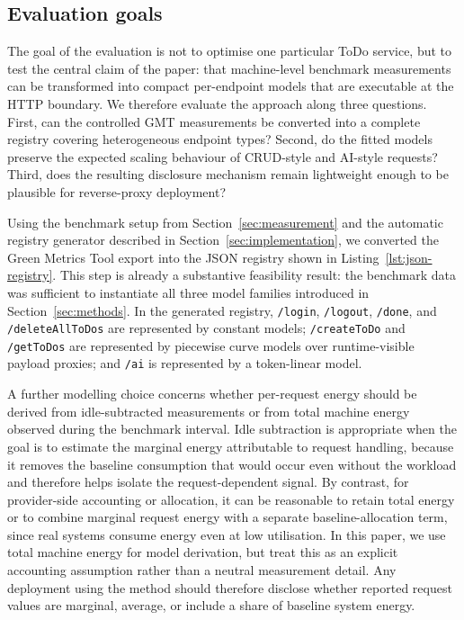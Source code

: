 \subsection{Evaluation goals}
The goal of the evaluation is not to optimise one particular ToDo service, but to test the central claim of the paper: that machine-level benchmark measurements can be transformed into compact per-endpoint models that are executable at the HTTP boundary. We therefore evaluate the approach along three questions. First, can the controlled GMT measurements be converted into a complete registry covering heterogeneous endpoint types? Second, do the fitted models preserve the expected scaling behaviour of CRUD-style and AI-style requests? Third, does the resulting disclosure mechanism remain lightweight enough to be plausible for reverse-proxy deployment?

Using the benchmark setup from Section~\ref{sec:measurement} and the automatic registry generator described in Section~\ref{sec:implementation}, we converted the Green Metrics Tool export into the JSON registry shown in Listing~\ref{lst:json-registry}. This step is already a substantive feasibility result: the benchmark data was sufficient to instantiate all three model families introduced in Section~\ref{sec:methods}. In the generated registry, \texttt{/login}, \texttt{/logout}, \texttt{/done}, and \texttt{/deleteAllToDos} are represented by constant models; \texttt{/createToDo} and \texttt{/getToDos} are represented by piecewise curve models over runtime-visible payload proxies; and \texttt{/ai} is represented by a token-linear model.

A further modelling choice concerns whether per-request energy should be derived from idle-subtracted measurements or from total machine energy observed during the benchmark interval. Idle subtraction is appropriate when the goal is to estimate the marginal energy attributable to request handling, because it removes the baseline consumption that would occur even without the workload and therefore helps isolate the request-dependent signal. By contrast, for provider-side accounting or allocation, it can be reasonable to retain total energy or to combine marginal request energy with a separate baseline-allocation term, since real systems consume energy even at low utilisation. In this paper, we use total machine energy for model derivation, but treat this as an explicit accounting assumption rather than a neutral measurement detail. Any deployment using the method should therefore disclose whether reported request values are marginal, average, or include a share of baseline system energy.

